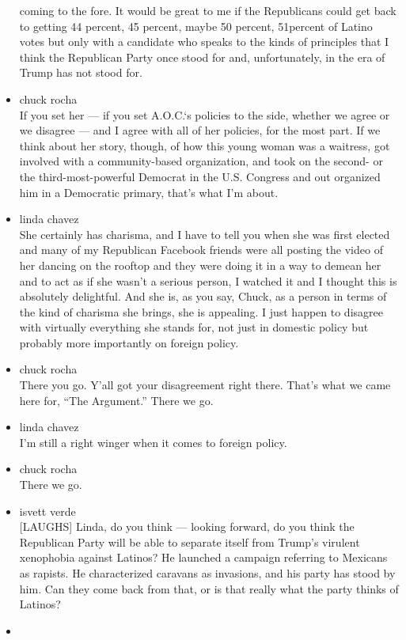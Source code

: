 \begin{itemize}
  coming to the fore. It would be great to me if the Republicans could
  get back to getting 44 percent, 45 percent, maybe 50 percent,
  51percent of Latino votes but only with a candidate who speaks to the
  kinds of principles that I think the Republican Party once stood for
  and, unfortunately, in the era of Trump has not stood for.
\item
  chuck rocha\\
  If you set her --- if you set A.O.C.`s policies to the side, whether
  we agree or we disagree --- and I agree with all of her policies, for
  the most part. If we think about her story, though, of how this young
  woman was a waitress, got involved with a community-based
  organization, and took on the second- or the third-most-powerful
  Democrat in the U.S. Congress and out organized him in a Democratic
  primary, that's what I'm about.
\item
  linda chavez\\
  She certainly has charisma, and I have to tell you when she was first
  elected and many of my Republican Facebook friends were all posting
  the video of her dancing on the rooftop and they were doing it in a
  way to demean her and to act as if she wasn't a serious person, I
  watched it and I thought this is absolutely delightful. And she is, as
  you say, Chuck, as a person in terms of the kind of charisma she
  brings, she is appealing. I just happen to disagree with virtually
  everything she stands for, not just in domestic policy but probably
  more importantly on foreign policy.
\item
  chuck rocha\\
  There you go. Y'all got your disagreement right there. That's what we
  came here for, ``The Argument.'' There we go.
\item
  linda chavez\\
  I'm still a right winger when it comes to foreign policy.
\item
  chuck rocha\\
  There we go.
\item
  isvett verde\\
  {[}LAUGHS{]} Linda, do you think --- looking forward, do you think the
  Republican Party will be able to separate itself from Trump's virulent
  xenophobia against Latinos? He launched a campaign referring to
  Mexicans as rapists. He characterized caravans as invasions, and his
  party has stood by him. Can they come back from that, or is that
  really what the party thinks of Latinos?
\item

\end{itemize}
